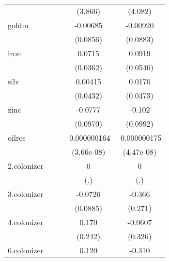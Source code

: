 {\begin{tabular}{l*{4}{c}}
            &                     &                     &     (3.866)         &     (4.082)         \\
[1em]
goldm       &                     &                     &    -0.00685         &    -0.00920         \\
            &                     &                     &    (0.0856)         &    (0.0883)         \\
[1em]
iron        &                     &                     &      0.0715         &      0.0919         \\
            &                     &                     &    (0.0362)         &    (0.0546)         \\
[1em]
silv        &                     &                     &     0.00415         &      0.0170         \\
            &                     &                     &    (0.0432)         &    (0.0473)         \\
[1em]
zinc        &                     &                     &     -0.0777         &      -0.102         \\
            &                     &                     &    (0.0970)         &    (0.0992)         \\
[1em]
oilres      &                     &                     &-0.000000164\sym{***}&-0.000000175\sym{**} \\
            &                     &                     &  (3.66e-08)         &  (4.47e-08)         \\
[1em]
2.colonizer &                     &                     &           0         &           0         \\
            &                     &                     &         (.)         &         (.)         \\
[1em]
3.colonizer &                     &                     &     -0.0726         &      -0.366         \\
            &                     &                     &    (0.0885)         &     (0.271)         \\
[1em]
4.colonizer &                     &                     &       0.170         &     -0.0607         \\
            &                     &                     &     (0.242)         &     (0.326)         \\
[1em]
6.colonizer &                     &                     &       0.120         &      -0.310         \\

\end{tabular}}
